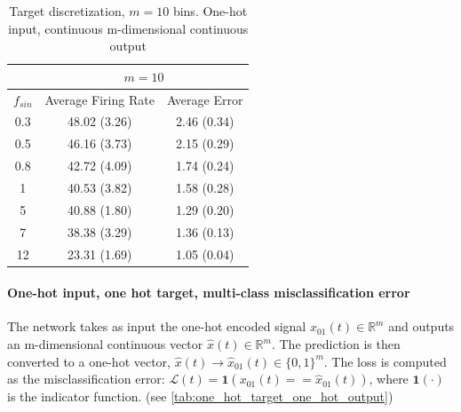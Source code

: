 \documentclass[10pt,a4paper, final]{report} %
\begin{document}
\begin{table}[H]
\centering
\begin{tabular}{c|c|c|}
\cline{2-3}
                          & \multicolumn{2}{|c|}{$m= 10$}            \\ \hline
\multicolumn{1}{|c|}{$f_{sin}$} & Average Firing Rate & Average Error     \\ \hline
\multicolumn{1}{|c|}{0.3} & 48.02 (3.26)  & 2.46 (0.34) \\
\multicolumn{1}{|c|}{0.5} & 46.16 (3.73)  & 2.15 (0.29) \\
\multicolumn{1}{|c|}{0.8} & 42.72 (4.09)  & 1.74 (0.24) \\
\multicolumn{1}{|c|}{1}   & 40.53 (3.82)  & 1.58 (0.28) \\
\multicolumn{1}{|c|}{5}   & 40.88 (1.80)  & 1.29 (0.20) \\
\multicolumn{1}{|c|}{7}   & 38.38 (3.29)  & 1.36 (0.13) \\
\multicolumn{1}{|c|}{12}  & 23.31 (1.69)  & 1.05 (0.04) \\ \hline
\end{tabular}
\caption{Target discretization, $m=10$ bins. One-hot input, continuous m-dimensional continuous output}
\label{tab:one_hot_target_continuous_output}
\end{table}

\paragraph{One-hot input, one hot target, multi-class misclassification error}
The network takes as input the one-hot encoded signal $x_{01}(t) \in \mathbb{R}^m$ and outputs an m-dimensional continuous vector $\hat{x}(t) \in \mathbb{R}^m$. 
The prediction is then converted to a one-hot vector, $\hat{x}(t) \rightarrow \hat{x}_{01}(t) \in \{0,1\}^m$. 
The loss is computed as the misclassification error: $\mathcal{L}(t) =  \mathbf{1}(x_{01}(t)== \hat{x}_{01}(t))$, where $\mathbf{1}(\cdot)$ is the indicator function. (see \autoref{tab:one_hot_target_one_hot_output})
\end{document}
